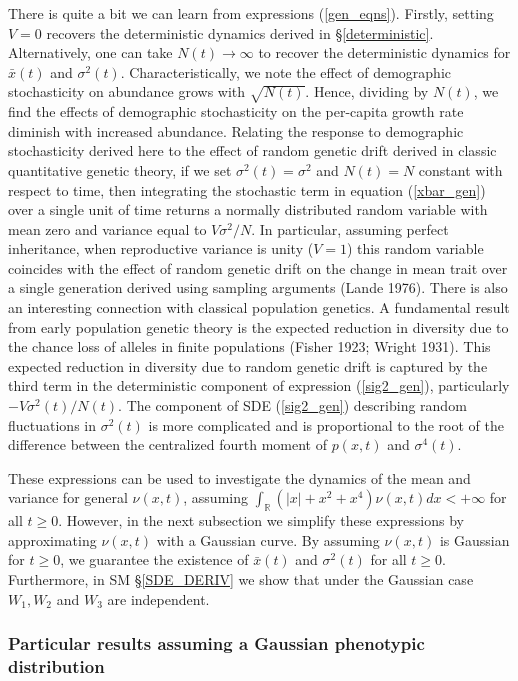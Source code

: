 \documentclass[]{article}
\begin{document}
There is quite a bit we can learn from expressions (\ref{gen_eqns}).
Firstly, setting \(V=0\) recovers the deterministic dynamics derived in
\S\ref{deterministic}. Alternatively, one can take \(N(t)\to\infty\) to
recover the deterministic dynamics for \(\bar x(t)\) and
\(\sigma^2(t)\). Characteristically, we note the effect of demographic
stochasticity on abundance grows with \(\sqrt{N(t)}\). Hence, dividing
by \(N(t)\), we find the effects of demographic stochasticity on the
per-capita growth rate diminish with increased abundance. Relating the
response to demographic stochasticity derived here to the effect of
random genetic drift derived in classic quantitative genetic theory, if
we set \(\sigma^2(t)=\sigma^2\) and \(N(t)=N\) constant with respect to
time, then integrating the stochastic term in equation (\ref{xbar_gen})
over a single unit of time returns a normally distributed random
variable with mean zero and variance equal to \(V\sigma^2/N\). In
particular, assuming perfect inheritance, when reproductive variance is
unity (\(V=1\)) this random variable coincides with the effect of random
genetic drift on the change in mean trait over a single generation
derived using sampling arguments (Lande 1976). There is also an
interesting connection with classical population genetics. A fundamental
result from early population genetic theory is the expected reduction in
diversity due to the chance loss of alleles in finite populations
(Fisher 1923; Wright 1931). This expected reduction in diversity due to
random genetic drift is captured by the third term in the deterministic
component of expression (\ref{sig2_gen}), particularly
\(-V\sigma^2(t)/N(t)\). The component of SDE (\ref{sig2_gen}) describing
random fluctuations in \(\sigma^2(t)\) is more complicated and is
proportional to the root of the difference between the centralized
fourth moment of \(p(x,t)\) and \(\sigma^4(t)\).

These expressions can be used to investigate the dynamics of the mean
and variance for general \(\nu(x,t)\), assuming
\(\int_\mathbb{R}(|x|+x^2+x^4)\nu(x,t)dx<+\infty\) for all \(t\geq0\).
However, in the next subsection we simplify these expressions by
approximating \(\nu(x,t)\) with a Gaussian curve. By assuming
\(\nu(x,t)\) is Gaussian for \(t\geq0\), we guarantee the existence of
\(\bar x(t)\) and \(\sigma^2(t)\) for all \(t\geq0\). Furthermore, in SM
\S\ref{SDE_DERIV} we show that under the Gaussian case \(W_1,W_2\) and
\(W_3\) are independent.

\hypertarget{particular-results-assuming-a-gaussian-phenotypic-distribution}{%
\subsubsection{\texorpdfstring{Particular results assuming a Gaussian
phenotypic distribution
\label{particular}}{Particular results assuming a Gaussian phenotypic distribution }}\label{particular-results-assuming-a-gaussian-phenotypic-distribution}}
\end{document}

